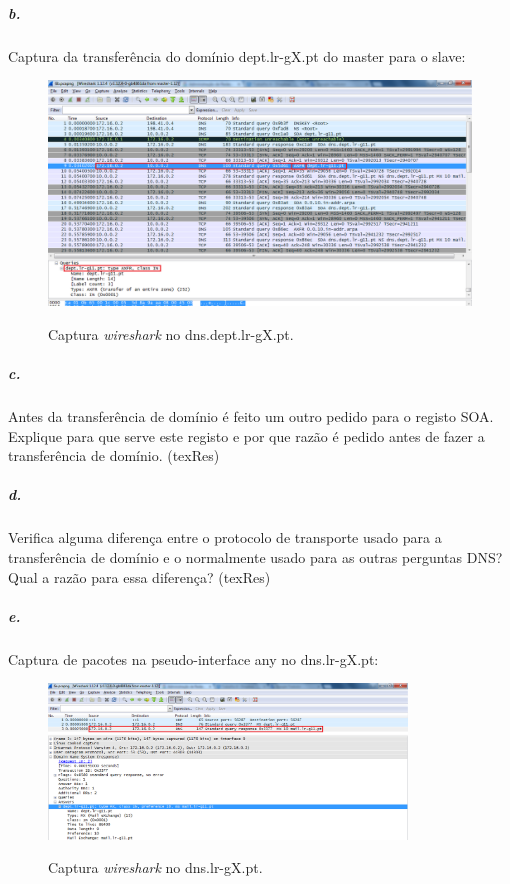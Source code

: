 \newpage
\subparagraph{b.}
Captura da transferência do domínio \textsf{dept.lr-gX.pt} do \textsf{master} para o \textsf{slave}:

\begin{figure}[h]
\centering
\includegraphics[width=1\textwidth, height=0.38\textheight]{6b_cap.png}
\label{fig:2-capturaWireshark}
\caption{Captura \emph{wireshark} no \textsf{dns.dept.lr-gX.pt}.}
\end{figure}


\subparagraph{c.}
Antes da transferência de domínio é feito um outro pedido para o registo SOA. Explique para que serve este registo e por que razão é pedido antes de fazer a transferência de domínio. (texRes)


\subparagraph{d.}
Verifica alguma diferença entre o protocolo de transporte usado para a transferência de domínio e o normalmente usado para as outras perguntas DNS? Qual a razão para essa diferença? (texRes)


\subparagraph{e.}
Captura de pacotes na pseudo-interface \textsf{any} no dns.lr-gX.pt:

\begin{figure}[h]
\centering
\includegraphics[width=0.85\textwidth, height=0.25\textheight]{6e_cap.png}
\label{fig:2-capturaWireshark}
\caption{Captura \emph{wireshark} no \textsf{dns.lr-gX.pt}.}
\end{figure}

